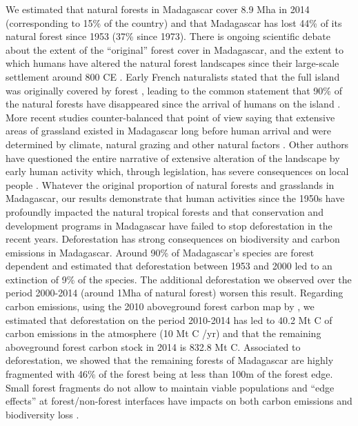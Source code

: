 \documentclass[a4paper, 12pt, leqno]{article} %
\begin{document}
We estimated that natural forests in Madagascar cover 8.9 Mha in 2014
(corresponding to 15\% of the country) and that Madagascar has lost
44\% of its natural forest since 1953 (37\% since 1973). There is
ongoing scientific debate about the extent of the ``original'' forest
cover in Madagascar, and the extent to which humans have altered the
natural forest landscapes since their large-scale settlement around
800 CE \citep{Burns2016, Cox2012}. Early French naturalists stated
that the full island was originally covered by forest
\citep{Humbert1927, Perrier1921}, leading to the common statement that
90\% of the natural forests have disappeared since the arrival of
humans on the island \citep{Kull2000}. More recent studies
counter-balanced that point of view saying that extensive areas of
grassland existed in Madagascar long before human arrival and were
determined by climate, natural grazing and other natural factors
\citep{Vorontsova2017, Virah-Sawmy2009}. Other authors have questioned
the entire narrative of extensive alteration of the landscape by early
human activity which, through legislation, has severe consequences on
local people \citep{Klein2002, Kull2000}. Whatever the original
proportion of natural forests and grasslands in Madagascar, our
results demonstrate that human activities since the 1950s have
profoundly impacted the natural tropical forests and that conservation
and development programs in Madagascar have failed to stop
deforestation in the recent years. Deforestation has strong
consequences on biodiversity and carbon emissions in
Madagascar. Around 90\% of Madagascar's species are forest dependent
\citep{Allnutt2008, Goodman2005} and \citet{Allnutt2008} estimated
that deforestation between 1953 and 2000 led to an extinction of 9\%
of the species. The additional deforestation we observed over the
period 2000-2014 (around 1Mha of natural forest) worsen this
result. Regarding carbon emissions, using the 2010 aboveground forest
carbon map by \citet{Vieilledent2016}, we estimated that deforestation
on the period 2010-2014 has led to 40.2 Mt C of carbon emissions in
the atmosphere (10 Mt C /yr) and that the remaining aboveground forest
carbon stock in 2014 is 832.8 Mt C. Associated to deforestation, we
showed that the remaining forests of Madagascar are highly fragmented
with 46\% of the forest being at less than 100m of the forest
edge. Small forest fragments do not allow to maintain viable
populations and ``edge effects'' at forest/non-forest interfaces have
impacts on both carbon emissions \citep{Brinck2017} and biodiversity
loss \citep{Gibson2013, Murcia1995}.
\end{document}
